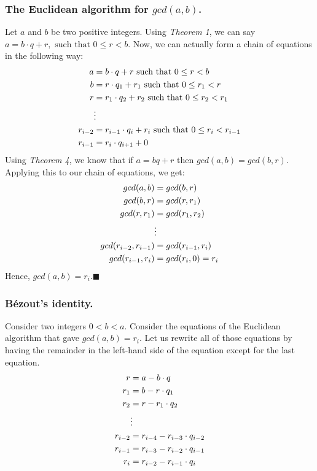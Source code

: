 \documentclass[manuscript,screen,review,nonacm]{acmart}
\begin{document}
{\subsubsection*{The Euclidean algorithm for $gcd(a,b)$.\newline}
Let $a$ and $b$ be two positive integers. Using \textit{Theorem 1}, we can say $a = b\cdot q + r, \text{  such that } 0\leq r<b$. Now, we can actually form a chain of equations in the following way:
\begin{align*}
    a &= b\cdot q + r\text{  such that } 0\leq r<b \\
    b &= r\cdot q_1 + r_1\text{  such that } 0\leq r_1<r \\
    r &= r_1\cdot q_2 + r_2\text{  such that } 0\leq r_2<r_1 \\
     &\vdots \notag \\
    r_{i-2} &=r_{i-1}\cdot q_{i} + r_i\text{  such that } 0\leq r_i<r_{i-1}\\
    r_{i-1} &=r_i\cdot q_{i+1} + 0
\end{align*}
Using \textit{Theorem 4}, we know that if $a = bq+r$ then $gcd(a,b) = gcd(b,r)$. Applying this to our chain of equations, we get:
\begin{align*}
     gcd(a,b) &= gcd(b,r)\\
        gcd(b,r) &= gcd(r,r_1)\\
        gcd(r,r_1) &= gcd(r_1, r_2)\\
         &\vdots \notag \\
        gcd(r_{i-2}, r_{i-1}) &= gcd(r_{i-1}, r_i) \\
        gcd(r_{i-1}, r_{i}) &= gcd(r_i, 0) = r_i \\
\end{align*}
Hence, $gcd(a,b) = r_i. \blacksquare$
\subsubsection*{Bézout's identity.\newline}
Consider two integers $0 < b < a$. Consider the equations of the Euclidean algorithm that gave $gcd(a,b) = r_i$. Let us rewrite all of those equations by having the remainder in the left-hand side of the equation except for the last equation.
\begin{align}
     r &= a - b\cdot q \\
     r_1 &= b - r\cdot q_1 \\
     r_2 &= r - r_1\cdot q_2 \\
     &\vdots \notag \\
     r_{i-2} &= r_{i-4} - r_{i-3}\cdot q_{i-2}\\
     r_{i-1} &= r_{i-3} - r_{i-2}\cdot q_{i-1}\\
     r_{i} &= r_{i-2} - r_{i-1}\cdot q_i
\end{align}
       
}
\end{document}
